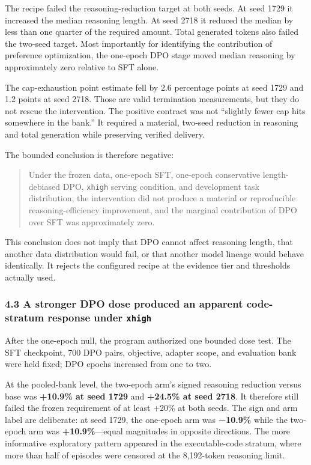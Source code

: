 \documentclass[
]{article}
\begin{document}
The recipe failed the reasoning-reduction target at both seeds. At seed
1729 it increased the median reasoning length. At seed 2718 it reduced
the median by less than one quarter of the required amount. Total
generated tokens also failed the two-seed target. Most importantly for
identifying the contribution of preference optimization, the one-epoch
DPO stage moved median reasoning by approximately zero relative to SFT
alone.

The cap-exhaustion point estimate fell by 2.6 percentage points at seed
1729 and 1.2 points at seed 2718. Those are valid termination
measurements, but they do not rescue the intervention. The positive
contract was not ``slightly fewer cap hits somewhere in the bank.'' It
required a material, two-seed reduction in reasoning and total
generation while preserving verified delivery.

The bounded conclusion is therefore negative:

\begin{quote}
Under the frozen data, one-epoch SFT, one-epoch conservative
length-debiased DPO, \texttt{xhigh} serving condition, and development
task distribution, the intervention did not produce a material or
reproducible reasoning-efficiency improvement, and the marginal
contribution of DPO over SFT was approximately zero.
\end{quote}

This conclusion does not imply that DPO cannot affect reasoning length,
that another data distribution would fail, or that another model lineage
would behave identically. It rejects the configured recipe at the
evidence tier and thresholds actually used.

\subsubsection{\texorpdfstring{4.3 A stronger DPO dose produced an
apparent code-stratum response under
\texttt{xhigh}}{4.3 A stronger DPO dose produced an apparent code-stratum response under xhigh}}\label{43-a-stronger-dpo-dose-produced-an-apparent-code-stratum-response-under-xhigh}

After the one-epoch null, the program authorized one bounded dose test.
The SFT checkpoint, 700 DPO pairs, objective, adapter scope, and
evaluation bank were held fixed; DPO epochs increased from one to two.

At the pooled-bank level, the two-epoch arm's signed reasoning reduction
versus base was \textbf{+10.9\% at seed 1729} and \textbf{+24.5\% at
seed 2718}. It therefore still failed the frozen requirement of at least
+20\% at both seeds. The sign and arm label are deliberate: at seed
1729, the one-epoch arm was \textbf{−10.9\%} while the two-epoch arm was
\textbf{+10.9\%}---equal magnitudes in opposite directions. The more
informative exploratory pattern appeared in the executable-code stratum,
where more than half of episodes were censored at the 8,192-token
reasoning limit.
\end{document}
